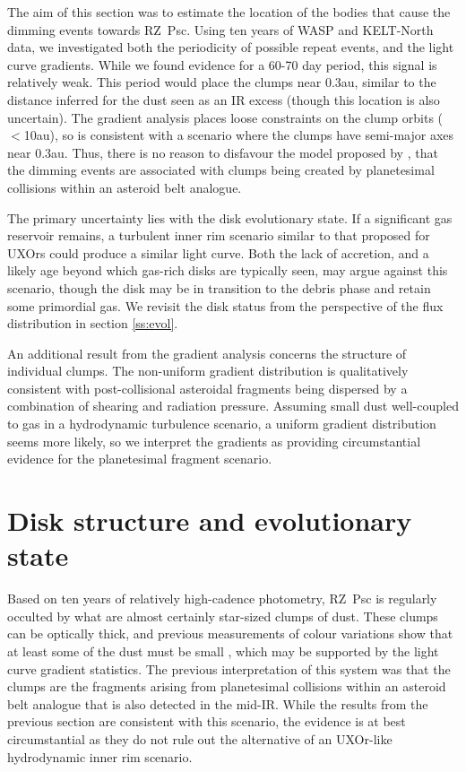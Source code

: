 \documentclass[useAMS,usenatbib,usegraphicx]{mn2e}
\begin{document}
The aim of this section was to estimate the location of the bodies that cause the dimming
events towards RZ~Psc. Using ten years of WASP and KELT-North data, we investigated both the
periodicity of possible repeat events, and the light curve gradients. While we found
evidence for a 60-70 day period, this signal is relatively weak. This period would place
the clumps near 0.3au, similar to the distance inferred for the dust seen as an IR excess
(though this location is also uncertain). The gradient analysis places loose constraints
on the clump orbits ($<$10au), so is consistent with a scenario where the clumps have
semi-major axes near 0.3au. Thus, there is no reason to disfavour the model proposed by
\citet{2013A&A...553L...1D}, that the dimming events are associated with clumps being
created by planetesimal collisions within an asteroid belt analogue.

The primary uncertainty lies with the disk evolutionary state. If a significant gas
reservoir remains, a turbulent inner rim scenario similar to that proposed for UXOrs
could produce a similar light curve. Both the lack of accretion, and a likely age beyond
which gas-rich disks are typically seen, may argue against this scenario, though the disk
may be in transition to the debris phase and retain some primordial gas. We revisit the
disk status from the perspective of the flux distribution in section \ref{ss:evol}.

An additional result from the gradient analysis concerns the structure of individual
clumps. The non-uniform gradient distribution is qualitatively consistent with
post-collisional asteroidal fragments being dispersed by a combination of shearing and
radiation pressure. Assuming small dust well-coupled to gas in a hydrodynamic turbulence
scenario, a uniform gradient distribution seems more likely, so we interpret the
gradients as providing circumstantial evidence for the planetesimal fragment scenario.

\section{Disk structure and evolutionary state}\label{s:disk}

Based on ten years of relatively high-cadence photometry, RZ~Psc is regularly occulted by
what are almost certainly star-sized clumps of dust. These clumps can be optically thick,
and previous measurements of colour variations show that at least some of the dust must
be small \citep[e.g.][]{2003ARep...47..580S}, which may be supported by the light curve
gradient statistics. The previous interpretation of this system was that the clumps are
the fragments arising from planetesimal collisions within an asteroid belt analogue that
is also detected in the mid-IR. While the results from the previous section are
consistent with this scenario, the evidence is at best circumstantial as they do not rule
out the alternative of an UXOr-like hydrodynamic inner rim scenario.
\end{document}
